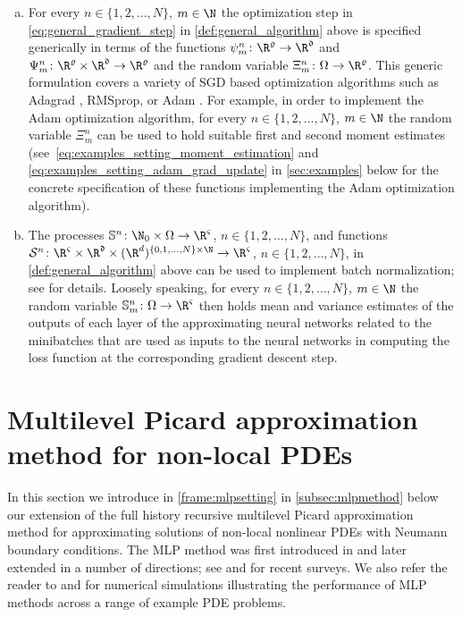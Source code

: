 \begin{enumerate}[(a)]
	\item For every $n\in\{1,2,\dots,N\}$, $m\in\N$ the optimization step in \cref{eq:general_gradient_step} in \cref{def:general_algorithm} above is specified generically in terms of the functions $\psi^n_m\colon \R^{\varrho}\to\R^{\mathfrak d}$ and $\Psi^n_m\colon\R^{\varrho}\times\R^{\mathfrak d}\to\R^{\varrho}$ and the random variable $\Xi^n_m\colon \Omega\to\R^{\varrho}$. This generic formulation covers a variety of SGD based optimization algorithms such as Adagrad \citep{duchi2011adaptive}, RMSprop, or Adam \citep{Kingma2014}. For example, in order to implement the Adam optimization algorithm, for every $n\in\{1,2,\dots,N\}$, $m\in\N$ the random variable $\Xi^n_m$ can be used to hold suitable first and second moment estimates (see~\cref{eq:examples_setting_moment_estimation} and \cref{eq:examples_setting_adam_grad_update} in \cref{sec:examples} below for the concrete specification of these functions implementing the Adam optimization algorithm).
	\item The processes $\mathbb{S}^n\colon \N_0\times\Omega \to \R^{\varsigma}$, $n\in\{1,2,\ldots,N\}$, and functions $\mathcal S^n\colon \R^{\varsigma}\times\R^{\mathfrak d}\times(\R^d)^{\{0,1,\dots,N\}\times\N}\to\R^\varsigma$, $n\in\{1,2,\dots,N\}$, in \cref{def:general_algorithm} above can be used to implement batch normalization; see \cite{ioffe2015batch} for details. Loosely speaking, for every $n\in\{1,2,\dots,N\}$, $m\in\N$ the random variable $\mathbb S^n_m\colon \Omega\to\R^\varsigma$ then holds mean and variance estimates of the outputs of each layer of the approximating neural networks related to the minibatches that are used as inputs to the neural networks in computing the loss function at the corresponding gradient descent step.
\end{enumerate}

\section{Multilevel Picard approximation method for non-local PDEs}
\label{sec:MLP}

In this section we introduce in \cref{frame:mlpsetting} in \cref{subsec:mlpmethod} below our extension of the full history recursive multilevel Picard approximation method for approximating solutions of non-local nonlinear PDEs with Neumann boundary conditions. The MLP method was first introduced in \cite{Weinan2021,Hutzenthaler2020} and later extended in a number of directions; see \cite{E2020} and \cite{Beck2020} for recent surveys. We also refer the reader to \cite{becker2020numerical} and \cite{E2019multilevel} for numerical simulations illustrating the performance of MLP methods across a range of example PDE problems.

